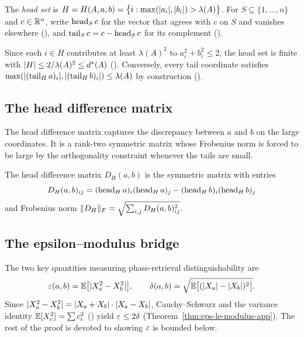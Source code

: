 \begin{definition}\label{def:head-set}
The \emph{head set} is
$H = H(A,a,b)
= \bigl\{i : \max(\lvert a_i \rvert, \lvert b_i \rvert) > \lambda(A)\bigr\}$.
For $S \subseteq \{1, \dots, n\}$ and $c \in \mathbb{R}^n$, write $\operatorname{head}_S c$ for
the vector that agrees with $c$ on $S$ and vanishes elsewhere
(), and
$\operatorname{tail}_S c = c - \operatorname{head}_S c$ for its complement
().
\end{definition}

Since each $i \in H$ contributes at least $\lambda(A)^2$ to
$a_i^2 + b_i^2 \le 2$, the head set is finite with
$\lvert H \rvert \le 2/\lambda(A)^2 \le d^*(A)$
().
Conversely, every tail coordinate satisfies
$\max(\lvert (\operatorname{tail}_H a)_i \rvert, \lvert (\operatorname{tail}_H b)_i \rvert) \le \lambda(A)$
by construction
().

\label{thm:head-card}%
\label{thm:tail-bound}%

\subsection{The head difference matrix}

The head difference matrix captures the discrepancy between $a$ and $b$ on
the large coordinates. It is a rank-two symmetric matrix whose Frobenius norm
is forced to be large by the orthogonality constraint whenever the tails
are small.

\begin{definition}\label{def:diff-matrix}
The head difference matrix $D_H(a,b)$ is the symmetric matrix with entries
\[
D_H(a,b)_{ij}
= (\operatorname{head}_H a)_i (\operatorname{head}_H a)_j
- (\operatorname{head}_H b)_i (\operatorname{head}_H b)_j
\]
and Frobenius norm
$\lVert D_H \rVert_F = \sqrt{\sum_{i,j} D_H(a,b)_{ij}^2}$.
\end{definition}

\subsection{The epsilon--modulus bridge}

The two key quantities measuring phase-retrieval distinguishability are
\[
\varepsilon(a,b) = \mathbb{E}\bigl[\lvert X_a^2 - X_b^2 \rvert\bigr],
\qquad
\delta(a,b)
= \sqrt{\mathbb{E}\bigl[(\lvert X_a \rvert - \lvert X_b \rvert)^2\bigr]}.
\]
Since
$\lvert X_a^2 - X_b^2 \rvert
= \lvert X_a + X_b \rvert \cdot \lvert X_a - X_b \rvert$,
Cauchy--Schwarz and the variance identity
$\mathbb{E}[X_c^2] = \sum c_i^2$
()
yield $\varepsilon \le 2\delta$
(Theorem~\ref{thm:eps-le-modulus-app}). The rest of the
proof is devoted to showing $\varepsilon$ is bounded below.


